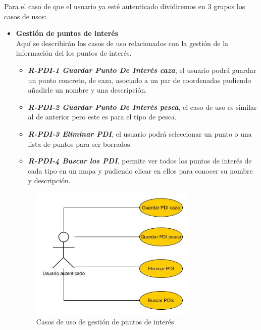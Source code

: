 Para el caso de que el usuario ya esté autenticado dividiremos en 3 grupos los casos de usos:
\begin{itemize}
\item \textbf{Gestión de puntos de interés}\\
Aquí se describirán los casos de uso relacionados con la gestión  de la información del los puntos de interés.
\begin{itemize}
\item\textbf{\textit{ R-PDI-1 Guardar Punto De Interés caza}}, el usuario podrá guardar un punto concreto, de caza, asociado a un par de coordenadas pudiendo añadirle un nombre y una descripción.
\item\textit{ \textbf{R-PDI-2 Guardar Punto De Interés pesca}}, el caso de uso es similar al de anterior pero este es para el tipo de pesca.
\item \textbf{\textit{R-PDI-3 Eliminar PDI}}, el usuario podrá seleccionar un punto o una lista de puntos para ser borrados.
\item \textbf{\textit{R-PDI-4 Buscar los PDI}}, permite ver todos los puntos de interés de cada tipo en un mapa y pudiendo clicar en ellos para conocer su nombre y descripción.
\end{itemize} 

\begin{figure}[H]
		\centering
		\includegraphics[width=0.75\textwidth] {PDI.jpg}
		\caption{Casos de uso de gestión de puntos de interés }
	\end{figure}
	
	
	

\end{itemize}
